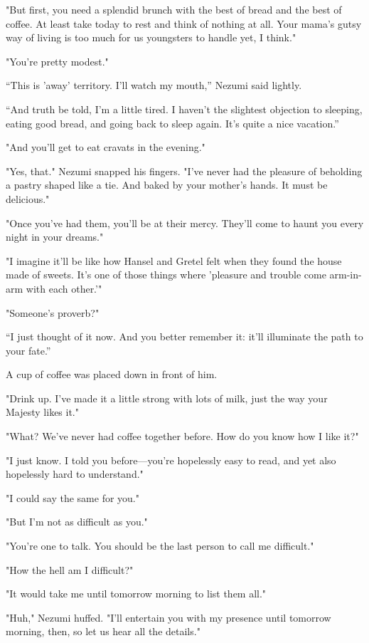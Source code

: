 "But first, you need a splendid brunch with the best of bread and the
best of coffee. At least take today to rest and think of nothing at all.
Your mama's gutsy way of living is too much for us youngsters to handle
yet, I think."

"You're pretty modest."

``This is 'away' territory. I'll watch my mouth,'' Nezumi said lightly.

``And truth be told, I'm a little tired. I haven't the slightest
objection to sleeping, eating good bread, and going back to sleep again.
It's quite a nice vacation.''

"And you'll get to eat cravats in the evening."

"Yes, that." Nezumi snapped his fingers. "I've never had the pleasure of
beholding a pastry shaped like a tie. And baked by your mother's hands.
It must be delicious."

"Once you've had them, you'll be at their mercy. They'll come to haunt
you every night in your dreams."

"I imagine it'll be like how Hansel and Gretel felt when they found the
house made of sweets. It's one of those things where 'pleasure and
trouble come arm-in-arm with each other.'"

"Someone's proverb?"

``I just thought of it now. And you better remember it: it'll illuminate
the path to your fate.''

A cup of coffee was placed down in front of him.

"Drink up. I've made it a little strong with lots of milk, just the way
your Majesty likes it."

"What? We've never had coffee together before. How do you know how I
like it?"

"I just know. I told you before---you're hopelessly easy to read, and yet
also hopelessly hard to understand."

"I could say the same for you."

"But I'm not as difficult as you."

"You're one to talk. You should be the last person to call me
difficult."

"How the hell am I difficult?"

"It would take me until tomorrow morning to list them all."

"Huh," Nezumi huffed. "I'll entertain you with my presence until
tomorrow morning, then, so let us hear all the details."


